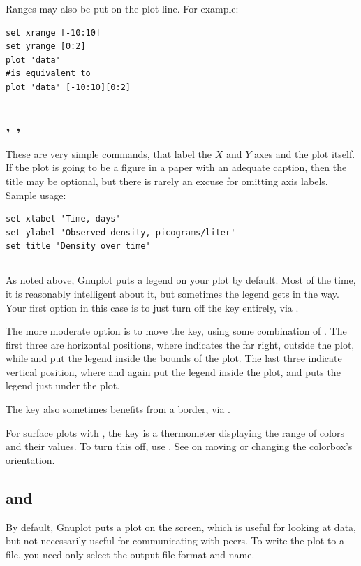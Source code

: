 Ranges may also be put on the plot line. For example:
\begin{lstlisting}
set xrange [-10:10]
set yrange [0:2]
plot 'data'
#is equivalent to
plot 'data' [-10:10][0:2]
\end{lstlisting}

\subsection{, , } These are
very simple commands, that label the $X$
and $Y$ axes and the plot itself. If the plot is going to be a figure
in a paper with an adequate caption, then the title may be optional, but
there is rarely an excuse for omitting axis labels. Sample usage:
\begin{lstlisting}
set xlabel 'Time, days'
set ylabel 'Observed density, picograms/liter'
set title 'Density over time'
\end{lstlisting}

\subsection{}  As noted above, Gnuplot
puts a legend on your plot by default. Most of the time, it is
reasonably intelligent about it, but sometimes the legend gets in the
way. Your first option in this case is to just turn off the key
entirely, via .

The more moderate option is to move the key, using some combination of 
. The first three are
horizontal positions, where  indicates the far right,
outside the plot, while  and  put the
legend inside the bounds of the plot. The last three indicate vertical
position, where  and  again put the legend inside the
plot, and  puts the legend just under the plot.

The key also sometimes benefits from a border, via .

For surface plots with , the key is a thermometer displaying
the range of colors and their values. To turn this off, use . See  on moving or changing the
colorbox's orientation.

\subsection{ and }  By 
default, Gnuplot puts a plot on the screen, which is useful for looking
at data, but not necessarily useful for communicating with peers. To
write the plot to a file, you need only select the output file format and name.


